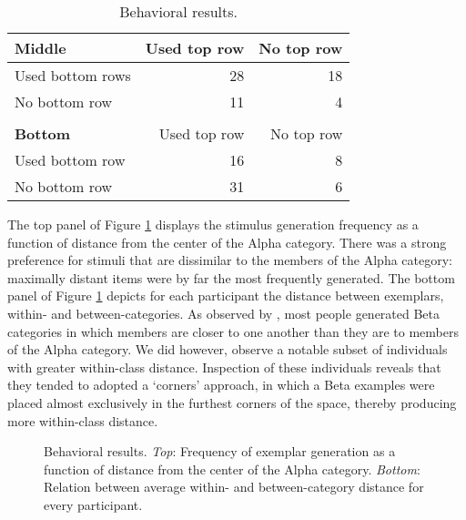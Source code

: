 \documentclass[10pt,letterpaper]{article}
\newcommand\inputpgf[2]{{
\let\pgfimageWithoutPath\pgfimage
\renewcommand{\pgfimage}[2][]{\pgfimageWithoutPath[##1]{#1/##2}}

}}
\begin{document}
\begin{table}
\begin{center} 
\caption{Behavioral results.} 
\label{table:subset-table} 
\vskip 0.12in
\begin{tabular}{ l r r}
    \textbf{Middle}         & Used top row & No top row \\
    \hline
    Used bottom rows       &  28 & 18  \\
    No bottom row          &  11 &  4  \\
    \\
    \textbf{Bottom}         & Used top row & No top row \\
    \hline
    Used bottom row        & 16 & 8 \\
    No bottom row          & 31 & 6 \\
\end{tabular}
\end{center} 
\end{table}


The top panel of Figure \ref{fig:distance.figs} displays the stimulus generation frequency as a function of distance from the center of the Alpha category. There was a strong preference for stimuli that are dissimilar to the members of the Alpha category: maximally distant items were by far the most frequently generated. The bottom panel of Figure \ref{fig:distance.figs} depicts for each participant the distance between exemplars, within- and between-categories. As observed by \citet{ward1994structured}, most people generated Beta categories in which members are closer to one another than they are to members of the Alpha category. We did however, observe a notable subset of individuals with greater within-class distance. Inspection of these individuals reveals that they tended to adopted a `corners' approach, in which a Beta examples were placed almost exclusively in the furthest corners of the space, thereby producing more within-class distance.
 

\begin{figure}
    \begin{center}
    \inputpgf{figs/}{distance.figs.pgf}
    \caption{Behavioral results. \textit{Top}: Frequency of exemplar generation as a function of distance from the center of the Alpha category. \textit{Bottom}: Relation between average within- and between-category distance for every participant. }
    \label{fig:distance.figs}
    \end{center}
\end{figure}
\end{document}
